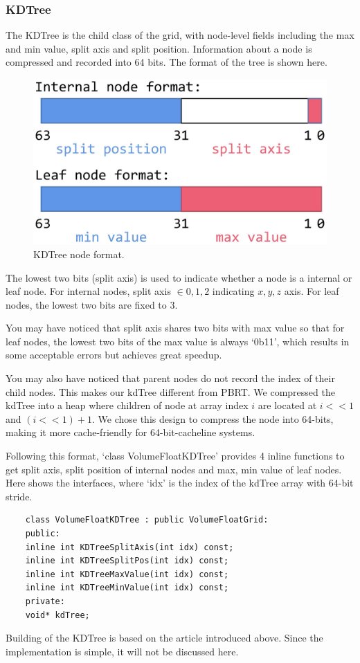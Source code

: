 \documentclass[acmtog]{acmart}
\begin{document}
\subsubsection{KDTree}
The KDTree is the child class of the grid, with node-level fields including the max and min value, split axis and split position.
Information about a node is compressed and recorded into 64 bits.
The format of the tree is shown here.
\begin{figure}[H]
	\includegraphics[scale=0.065]{pictures/kdTree format.png}
	\centering
	\caption{KDTree node format.}
\end{figure}
The lowest two bits (split axis) is used to indicate whether a node is a internal or leaf node.
For internal nodes, split axis $\in { 0, 1, 2 }$ indicating ${ x, y, z }$ axis.
For leaf nodes, the lowest two bits are fixed to $3$.\par
You may have noticed that split axis shares two bits with max value so that
for leaf nodes, the lowest two bits of the max value is always `0b11', 
which results in some acceptable errors but achieves great speedup.\par
You may also have noticed that parent nodes do not record the index of their child nodes.
This makes our kdTree different from PBRT.
We compressed the kdTree into a heap where children of node at array index $i$ are located at $i<<1$ and $(i<<1)+1$.
We chose this design to compress the node into 64-bits, making it more cache-friendly for 64-bit-cacheline systems.\par
Following this format, `class VolumeFloatKDTree' provides 4 inline functions to
get split axis, split position of internal nodes and max, min value of leaf nodes.
Here shows the interfaces, where `idx' is the index of the kdTree array with 64-bit stride.
\begin{lstlisting}
	class VolumeFloatKDTree : public VolumeFloatGrid:
	public:
	inline int KDTreeSplitAxis(int idx) const;
	inline int KDTreeSplitPos(int idx) const;
	inline int KDTreeMaxValue(int idx) const;
	inline int KDTreeMinValue(int idx) const;
	private:
	void* kdTree;
\end{lstlisting}
Building of the KDTree is based on the article introduced above.
Since the implementation is simple, it will not be discussed here.
\end{document}
